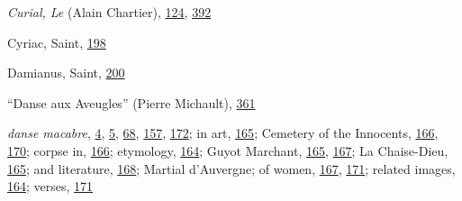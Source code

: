 \emph{Curial, Le} (Alain Chartier),
\protect\hyperlink{10_Chapter_Three__THE_HEROIC_DREAM.xhtmlux5cux23page_124}{124},
\protect\hyperlink{22_Chapter_Fourteen__THE_COMING_OF.xhtmlux5cux23page_392}{392}

Cyriac, Saint,
\protect\hyperlink{13_Chapter_Six__THE_DEPICTION_OF_TH.xhtmlux5cux23page_198}{198}

Damianus, Saint,
\protect\hyperlink{13_Chapter_Six__THE_DEPICTION_OF_TH.xhtmlux5cux23page_200}{200}

``Danse aux Aveugles'' (Pierre Michault),
\protect\hyperlink{21_Chapter_Thirteen__IMAGE_AND_WORD.xhtmlux5cux23page_361}{361}

\emph{danse macabre},
\protect\hyperlink{08_Chapter_One__THE_PASSIONATE_INTE.xhtmlux5cux23page_4}{4},
\protect\hyperlink{08_Chapter_One__THE_PASSIONATE_INTE.xhtmlux5cux23page_5}{5},
\protect\hyperlink{10_Chapter_Three__THE_HEROIC_DREAM.xhtmlux5cux23page_68}{68},
\protect\hyperlink{12_Chapter_Five__THE_VISION_OF_DEAT.xhtmlux5cux23page_157}{157},
\protect\hyperlink{12_Chapter_Five__THE_VISION_OF_DEAT.xhtmlux5cux23page_172}{172};
in art,
\protect\hyperlink{12_Chapter_Five__THE_VISION_OF_DEAT.xhtmlux5cux23page_165}{165};
Cemetery of the Innocents,
\protect\hyperlink{12_Chapter_Five__THE_VISION_OF_DEAT.xhtmlux5cux23page_166}{166},
\protect\hyperlink{12_Chapter_Five__THE_VISION_OF_DEAT.xhtmlux5cux23page_170}{170};
corpse in,
\protect\hyperlink{12_Chapter_Five__THE_VISION_OF_DEAT.xhtmlux5cux23page_166}{166};
etymology,
\protect\hyperlink{12_Chapter_Five__THE_VISION_OF_DEAT.xhtmlux5cux23page_164}{164};
Guyot Marchant,
\protect\hyperlink{12_Chapter_Five__THE_VISION_OF_DEAT.xhtmlux5cux23page_165}{165},
\protect\hyperlink{12_Chapter_Five__THE_VISION_OF_DEAT.xhtmlux5cux23page_167}{167};
La Chaise-Dieu,
\protect\hyperlink{12_Chapter_Five__THE_VISION_OF_DEAT.xhtmlux5cux23page_165}{165};
and literature,
\protect\hyperlink{12_Chapter_Five__THE_VISION_OF_DEAT.xhtmlux5cux23page_168}{168};
Martial d'Auvergne; of women,
\protect\hyperlink{12_Chapter_Five__THE_VISION_OF_DEAT.xhtmlux5cux23page_167}{167},
\protect\hyperlink{12_Chapter_Five__THE_VISION_OF_DEAT.xhtmlux5cux23page_171}{171};
related images,
\protect\hyperlink{12_Chapter_Five__THE_VISION_OF_DEAT.xhtmlux5cux23page_164}{164};
verses,
\protect\hyperlink{12_Chapter_Five__THE_VISION_OF_DEAT.xhtmlux5cux23page_171}{171}

